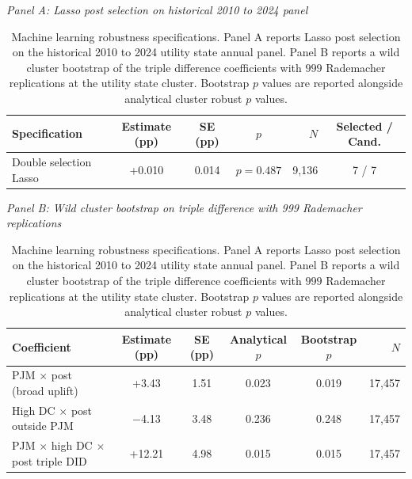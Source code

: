 \begin{table}[H]
\centering
\caption{Machine learning robustness specifications. Panel A reports Lasso post selection on the historical 2010 to 2024 utility state annual panel. Panel B reports a wild cluster bootstrap of the triple difference coefficients with $999$ Rademacher replications at the utility state cluster. Bootstrap $p$ values are reported alongside analytical cluster robust $p$ values.}
\label{tab:ml_robustness}
\small

\textit{Panel A: Lasso post selection on historical 2010 to 2024 panel}
\vspace{2pt}
\setlength{\tabcolsep}{6pt}
\begin{tabular}{l c c c r c}
\toprule
Specification & Estimate (pp) & SE (pp) & $p$ & $N$ & Selected / Cand. \\
\midrule
Double selection Lasso & +0.010 & 0.014 & $p=0.487$ & 9,136 & 7 / 7 \\
\bottomrule
\end{tabular}

\vspace{10pt}
\textit{Panel B: Wild cluster bootstrap on triple difference with 999 Rademacher replications}
\vspace{2pt}
\setlength{\tabcolsep}{3pt}
\begin{tabular}{l c c c c r}
\toprule
Coefficient & Estimate (pp) & SE (pp) & Analytical $p$ & Bootstrap $p$ & $N$ \\
\midrule
PJM $\times$ post (broad uplift) & +3.43 & 1.51 & 0.023 & 0.019 & 17,457 \\
High DC $\times$ post outside PJM & $-$4.13 & 3.48 & 0.236 & 0.248 & 17,457 \\
PJM $\times$ high DC $\times$ post triple DID & +12.21 & 4.98 & 0.015 & 0.015 & 17,457 \\
\bottomrule
\end{tabular}
\end{table}
